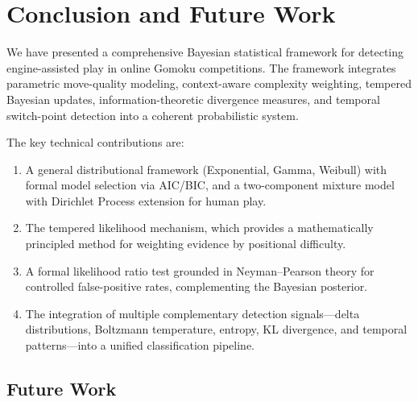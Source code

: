 \documentclass[11pt,a4paper]{article}
\begin{document}
\section{Conclusion and Future Work}
\label{sec:conclusion}

We have presented a comprehensive Bayesian statistical framework for detecting
engine-assisted play in online Gomoku competitions. The framework integrates
parametric move-quality modeling, context-aware complexity weighting, tempered
Bayesian updates, information-theoretic divergence measures, and temporal
switch-point detection into a coherent probabilistic system.

The key technical contributions are:
\begin{enumerate}
    \item A general distributional framework (Exponential, Gamma, Weibull)
          with formal model selection via AIC/BIC, and a two-component
          mixture model with Dirichlet Process extension for human play.
    \item The tempered likelihood mechanism, which provides a mathematically
          principled method for weighting evidence by positional difficulty.
    \item A formal likelihood ratio test grounded in Neyman--Pearson theory
          for controlled false-positive rates, complementing the Bayesian
          posterior.
    \item The integration of multiple complementary detection signals---delta
          distributions, Boltzmann temperature, entropy, KL divergence, and
          temporal patterns---into a unified classification pipeline.
\end{enumerate}

\subsection{Future Work}
\end{document}
